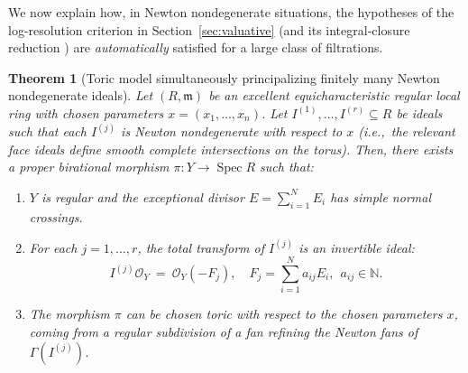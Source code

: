 \documentclass[12pt]{amsart}
\newcommand{\NN}{\mathbb{N}}
\newcommand{\m}{\mathfrak m}
\newcommand{\cO}{\mathcal{O}}
\DeclareMathOperator{\Spec}{Spec}
\theoremstyle{plain}
\newtheorem{theorem}{Theorem}[section]
\theoremstyle{definition}
\numberwithin{equation}{section}
\begin{document}
We now explain how, in Newton nondegenerate situations, the hypotheses of the
log-resolution criterion in Section~\ref{sec:valuative} (and its integral-closure reduction
) are \emph{automatically} satisfied for a large
class of filtrations.

\begin{theorem}[Toric model simultaneously principalizing finitely many Newton nondegenerate ideals]\label{thm:toric-simultaneous-principalization}
	Let $(R,\m)$ be an excellent equicharacteristic regular local ring with chosen parameters
	$x=(x_1,\dots,x_n)$.  Let $I^{(1)},\dots,I^{(r)}\subseteq R$ be ideals such that each
	$I^{(j)}$ is Newton nondegenerate with respect to $x$ (i.e.,\ the relevant face ideals define smooth complete intersections on the torus).
	Then, there exists a proper birational morphism $\pi:Y\to \Spec R$
	such that:
	\begin{enumerate}
		\item $Y$ is regular and the exceptional divisor $E=\sum_{i=1}^N E_i$ has simple normal crossings.
		\item For each $j=1,\dots,r$, the total transform of $I^{(j)}$ is an invertible ideal:
		\[
		I^{(j)}\cO_Y\ =\ \cO_Y(-F_j),
		\quad
		F_j=\sum_{i=1}^N a_{ij}E_i,\ \ a_{ij}\in\NN.
		\]
		\item The morphism $\pi$ can be chosen toric with respect to the chosen parameters $x$,
		coming from a regular subdivision of a fan refining the Newton fans of $\Gamma(I^{(j)})$.
	\end{enumerate}
\end{theorem}
\end{document}
